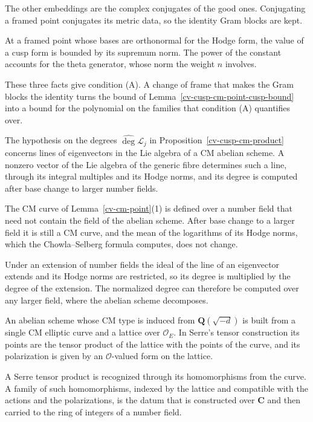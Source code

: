 The other embeddings are the complex conjugates of the good ones. Conjugating a framed point conjugates its metric
data, so the identity Gram blocks are kept.

At a framed point whose bases are orthonormal for the Hodge form, the value of a cusp form is bounded by its
supremum norm. The power of the constant accounts for the theta generator, whose norm the weight $n$ involves.

These three facts give condition (A). A change of frame that makes the Gram blocks the identity turns the bound of
Lemma~\ref{cv-cusp-cm-point-cusp-bound} into a bound for the polynomial on the families that condition (A)
quantifies over.

The hypothesis on the degrees $\widehat\deg\mathcal L_j$ in Proposition~\ref{cv-cusp-cm-product} concerns lines of
eigenvectors in the Lie algebra of a CM abelian scheme. A nonzero vector of the Lie algebra of the generic fibre
determines such a line, through its integral multiples and its Hodge norms, and its degree is computed after base
change to larger number fields.

The CM curve of Lemma~\ref{cv-cm-point}(1) is defined over a number field that need not contain the field of the
abelian scheme. After base change to a larger field it is still a CM curve, and the mean of the logarithms of its
Hodge norms, which the Chowla--Selberg formula computes, does not change.

Under an extension of number fields the ideal of the line of an eigenvector extends and its Hodge norms are restricted,
so its degree is multiplied by the degree of the extension. The normalized degree can therefore be computed over any
larger field, where the abelian scheme decomposes.

An abelian scheme whose CM type is induced from $\mathbf Q(\sqrt{-d})$ is built from a single CM elliptic curve and a
lattice over $\mathcal O_E$. In Serre's tensor construction its points are the tensor product of the lattice with the
points of the curve, and its polarization is given by an $\mathcal O$-valued form on the lattice.

A Serre tensor product is recognized through its homomorphisms from the curve. A family of such homomorphisms, indexed
by the lattice and compatible with the actions and the polarizations, is the datum that is constructed over
$\mathbf C$ and then carried to the ring of integers of a number field.

